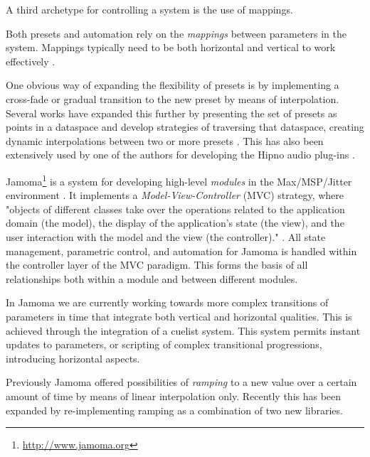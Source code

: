 \documentclass{article}
\begin{document}

A third archetype for controlling a system is the use of mappings.

Both presets and automation rely on the \emph{mappings} between parameters in the system.  Mappings typically need to be both horizontal and vertical to work effectively \cite{Hunt:2003,Nort:2006}.

One obvious way of expanding the flexibility of presets is by implementing a cross-fade or gradual transition to the new preset by means of interpolation. Several works have expanded this further by presenting the set of presets as points in a dataspace and develop strategies of traversing that dataspace, creating dynamic interpolations between two or more presets \cite{Bencina:2005metasurface, Dahlstedt:2001, Momeni:2003}. This has also been extensively used by one of the authors for developing the Hipno audio plug-ins \cite{Place:2005hipno}.

Jamoma\footnote{\url{http://www.jamoma.org}} is a system for developing high-level \emph{modules} in the Max/MSP/Jitter environment \cite{Place:2006}. It implements a \emph{Model-View-Controller} (MVC) strategy, where "objects of different classes take over the operations related to the application domain (the model), the display of the application's state (the view), and the user interaction with the model and the view (the controller)." \cite[p26]{Krasner:1988}. All state management, parametric control, and automation for Jamoma is handled within the controller layer of the MVC paradigm. This forms the basis of all relationships both within a module and between different modules.

In Jamoma we are currently working towards more complex transitions of parameters in time that integrate both vertical and horizontal qualities.  This is achieved through the integration of a cuelist system. This system permits instant updates to parameters, or scripting of complex transitional progressions, introducing horizontal aspects. 

Previously Jamoma offered possibilities of \emph{ramping} to a new value over a certain amount of time by means of linear interpolation only. Recently this has been expanded by re-implementing ramping as a combination of two new libraries.

\end{document}
